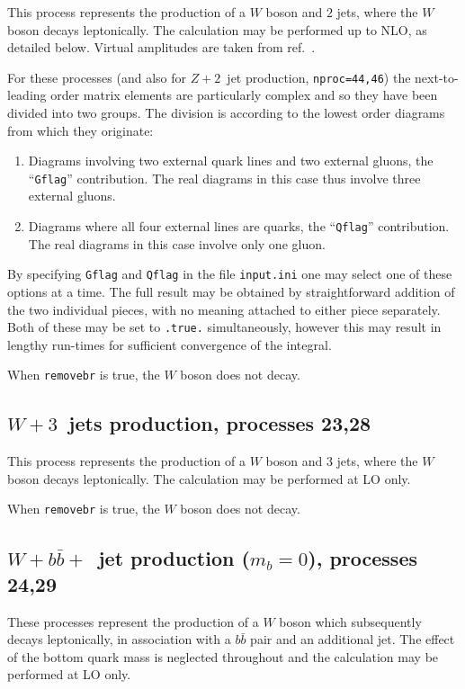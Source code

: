 This process represents the production of a $W$ boson and $2$ jets,
where the $W$ boson decays leptonically. The calculation may be
performed up to NLO, as detailed below. Virtual amplitudes are
taken from ref.~\cite{Bern:1997sc}.

For these processes (and also for $Z+2$~jet production, {\tt nproc=44,46})
the next-to-leading order matrix elements are
particularly complex and so they have been divided into two groups.
The division is according to the lowest order diagrams from which they
originate:
\begin{enumerate}
\item Diagrams involving two external quark lines and two external gluons,
the ``{\tt Gflag}'' contribution. The real diagrams in this case thus
involve three external gluons.

\item Diagrams where all four external lines are quarks,
the ``{\tt Qflag}'' contribution. The real diagrams in this case 
involve only one gluon.
\end{enumerate}

By specifying {\tt Gflag} and {\tt Qflag} in the file {\tt input.ini} one may
select one of these options at a time. The full result may be obtained
by straightforward addition of the two individual pieces, with no
meaning attached to either piece separately. 
Both of these may be set to {\tt .true.} simultaneously, however this
may result in lengthy run-times for sufficient convergence of the integral.

When {\tt removebr} is true, the $W$ boson does not decay.

\subsection{$W+3$~jets production, processes 23,28}
\label{subsec:w3jets}

This process represents the production of a $W$ boson and $3$ jets,
where the $W$ boson decays leptonically. The calculation may be
performed at LO only.

When {\tt removebr} is true, the $W$ boson does not decay.

\subsection{$W+b{\bar b}+$~jet production ($m_b=0$), processes 24,29}
\label{subsec:wbbjetmassless}

These processes represent the production of a $W$ boson which subsequently
decays leptonically, in association with a $b{\bar b}$ pair and an
additional jet. The effect of the bottom quark mass is neglected throughout
and the calculation may be performed at LO only.

